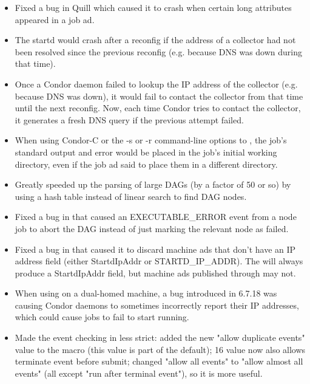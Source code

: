 \begin{itemize}

\item Fixed a bug in Quill which caused it to crash when certain
long attributes appeared in a job ad.

\item The startd would crash after a reconfig if the address of a
collector had not been resolved since the previous reconfig
(e.g. because DNS was down during that time).

\item Once a Condor daemon failed to lookup the IP address of the
collector (e.g. because DNS was down), it would fail to contact the
collector from that time until the next reconfig.  Now, each time Condor
tries to contact the collector, it generates a fresh DNS query if the
previous attempt failed.

\item When using Condor-C or the -s or -r command-line options to
, the job's standard output and error would be placed
in the job's initial working directory, even if the job ad said to
place them in a different directory.

\item Greatly speeded up the parsing of large DAGs (by a factor of 50
or so) by using a hash table instead of linear search to find DAG nodes.

\item Fixed a bug in  that caused an EXECUTABLE\_ERROR
event from a node job to abort the DAG instead of just marking the
relevant node as failed.

\item Fixed a bug in  that caused it to discard
machine ads that don't have an IP address field (either StartdIpAddr
or STARTD\_IP\_ADDR).  The  will always produce a
StartdIpAddr field, but machine ads published through
 may not.

\item When using  on a dual-homed
machine, a bug introduced in 6.7.18 was causing Condor daemons to
sometimes incorrectly report their IP addresses, which could cause
jobs to fail to start running.

\item Made the event checking in  less strict: 
added the new "allow duplicate events" value to the
 macro (this value is part of the
default); 16 value now also allows terminate event before submit;
changed "allow all events" to "allow almost all events"
(all except "run after terminal event"), so it is more useful.


\end{itemize}
